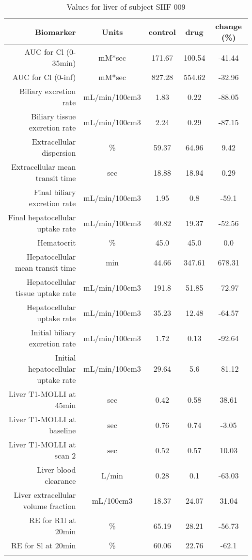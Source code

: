 \documentclass{epflreport}%
\begin{document}
%
\clearpage%
\begin{longtable}{rcccc}%
\hline%
Biomarker&Units&control&drug&change (\%)\\%
\hline%
AUC for Cl (0{-}35min)&mM*sec&171.67&100.54&{-}41.44\\%
AUC for Cl (0{-}inf)&mM*sec&827.28&554.62&{-}32.96\\%
Biliary excretion rate&mL/min/100cm3&1.83&0.22&{-}88.05\\%
Biliary tissue excretion rate&mL/min/100cm3&2.24&0.29&{-}87.15\\%
Extracellular dispersion&\%&59.37&64.96&9.42\\%
Extracellular mean transit time&sec&18.88&18.94&0.29\\%
Final biliary excretion rate&mL/min/100cm3&1.95&0.8&{-}59.1\\%
Final hepatocellular uptake rate&mL/min/100cm3&40.82&19.37&{-}52.56\\%
Hematocrit&\%&45.0&45.0&0.0\\%
Hepatocellular mean transit time&min&44.66&347.61&678.31\\%
Hepatocellular tissue uptake rate&mL/min/100cm3&191.8&51.85&{-}72.97\\%
Hepatocellular uptake rate&mL/min/100cm3&35.23&12.48&{-}64.57\\%
Initial biliary excretion rate&mL/min/100cm3&1.72&0.13&{-}92.64\\%
Initial hepatocellular uptake rate&mL/min/100cm3&29.64&5.6&{-}81.12\\%
Liver T1{-}MOLLI at 45min&sec&0.42&0.58&38.61\\%
Liver T1{-}MOLLI at baseline&sec&0.76&0.74&{-}3.05\\%
Liver T1{-}MOLLI at scan 2&sec&0.52&0.57&10.03\\%
Liver blood clearance&L/min&0.28&0.1&{-}63.03\\%
Liver extracellular volume fraction&mL/100cm3&18.37&24.07&31.04\\%
RE for R1l at 20min&\%&65.19&28.21&{-}56.73\\%
RE for Sl at 20min&\%&60.06&22.76&{-}62.1\\%
\hline%
\caption{Values for liver of subject SHF-009} \\%
\end{longtable}%
\end{document}
